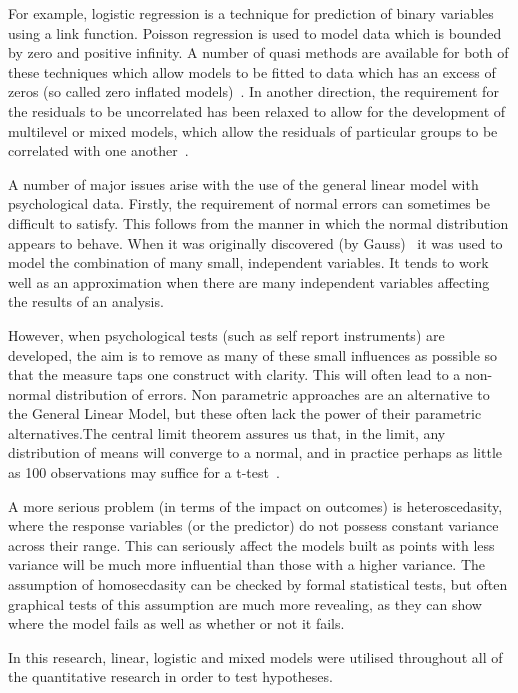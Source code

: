 For example, logistic regression is a technique for prediction of binary
 variables using a link function. Poisson regression is used to model data
 which is bounded by zero and positive infinity. A number of quasi methods
 are available for both of these techniques which allow models to be fitted
 to  data which has an excess of zeros (so called zero inflated models)~\cite{gelman2007data,venables2002modern}. In another direction, the
 requirement for the residuals to be uncorrelated has been relaxed to allow for the development of multilevel or mixed models, which allow the residuals of particular groups to be correlated with one another~\cite{gelman2007data}. 

A number of major issues arise with the use of the general linear model with psychological data. Firstly, the requirement of normal errors can sometimes be difficult to satisfy. This follows from the manner in which the normal distribution appears to behave. When it was originally discovered (by Gauss)~\cite{stigler1986history} it was used to model the combination of many small, independent variables. It tends to work well as an approximation when there are many independent variables affecting the results of an analysis.

However, when psychological tests (such as self report instruments) are developed, the aim is to remove as many of these small influences as possible so that the measure taps one construct with clarity. This will often lead to a non-normal distribution of errors. Non parametric approaches are an alternative to the General Linear Model, but these often lack the power of their parametric alternatives.The central limit theorem assures us that, in the limit, any distribution of means will converge to a normal, and in practice perhaps as little as 100 observations may suffice for a t-test~\cite{venables2002modern}. 

A more serious problem (in terms of the impact on outcomes) is heteroscedasity, where the response variables (or the predictor) do not possess constant variance across their range\cite{gelman2007data}. This can seriously affect the models built as points with less variance will be much more influential than those with a higher variance. The assumption of homosecdasity can be checked by formal statistical tests, but often graphical tests of this assumption are much more revealing, as they can show where the model fails as well as whether or not it fails.

In this research, linear, logistic and mixed models were utilised throughout all of the quantitative research in order to test hypotheses. 

